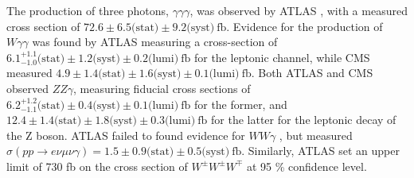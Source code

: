 The production of three photons, $\gamma\gamma\gamma$, was observed by ATLAS \cite{STDM-2016-06}, with a measured cross section of $72.6 \pm 6.5 \text{(stat)} \pm 9.2 \text{(syst)}~\text{fb}$.
Evidence for the production of $W\gamma\gamma$ was found by ATLAS \cite{STDM-2013-05} measuring a cross-section of $6.1^{+1.1}_{-1.0} \text{(stat)} \pm 1.2 \text{(syst)} \pm 0.2 \text{(lumi)}~\text{fb}$ for the leptonic channel,
while CMS \cite{SMP-15-008} measured $4.9 \pm 1.4 \text{(stat)} \pm 1.6 \text{(syst)} \pm 0.1 \text{(lumi)}~\text{fb}$.
Both ATLAS \cite{STDM-2014-01} and CMS \cite{SMP-15-008} observed $ZZ\gamma$, measuring fiducial cross sections of
$6.2^{+1.2}_{-1.1} \text{(stat)} \pm 0.4 \text{(syst)} \pm 0.1 \text{(lumi)}~\text{fb}$ for the former,
and $12.4 \pm 1.4 \text{(stat)} \pm 1.8 \text{(syst)} \pm 0.3 \text{(lumi)}~\text{fb}$ for the latter for the leptonic decay of the Z boson.
ATLAS failed to found evidence for $WW\gamma$ \cite{STDM-2016-05}, but measured $\sigma(pp \rightarrow e\nu \mu\nu \gamma) = 1.5 \pm 0.9 \text{(stat)} \pm 0.5 \text{(syst)}~\text{fb}$.
Similarly, ATLAS set an upper limit of 730 fb \cite{STDM-2015-07} on the cross section of $W^{\pm}W^{\pm}W^{\mp}$ at 95 \% confidence level.

